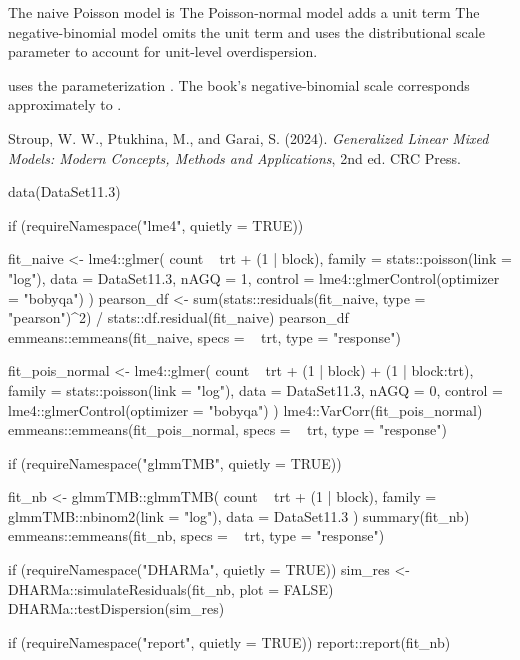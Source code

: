 \documentclass[a4paper]{book}
\begin{document}
%
\begin{Details}
The naive Poisson model is
The Poisson-normal model adds a unit term
The negative-binomial model omits the unit term and uses the distributional
scale parameter to account for unit-level overdispersion.
\end{Details}
%
\begin{Note}
 uses the  parameterization
. The book's negative-binomial scale
\eqn{\phi}{} corresponds approximately to .
\end{Note}
%
\begin{References}
Stroup, W. W., Ptukhina, M., and Garai, S. (2024).
\emph{Generalized Linear Mixed Models: Modern Concepts, Methods and
Applications}, 2nd ed. CRC Press.
\end{References}
%
\begin{SeeAlso}
\end{SeeAlso}
%
\begin{Examples}
\begin{ExampleCode}
data(DataSet11.3)

if (requireNamespace("lme4", quietly = TRUE)) {
  fit_naive <- lme4::glmer(
    count ~ trt + (1 | block),
    family = stats::poisson(link = "log"),
    data = DataSet11.3,
    nAGQ = 1,
    control = lme4::glmerControl(optimizer = "bobyqa")
  )
  pearson_df <- sum(stats::residuals(fit_naive, type = "pearson")^2) /
    stats::df.residual(fit_naive)
  pearson_df
  emmeans::emmeans(fit_naive, specs = ~ trt, type = "response")

  fit_pois_normal <- lme4::glmer(
    count ~ trt + (1 | block) + (1 | block:trt),
    family = stats::poisson(link = "log"),
    data = DataSet11.3,
    nAGQ = 0,
    control = lme4::glmerControl(optimizer = "bobyqa")
  )
  lme4::VarCorr(fit_pois_normal)
  emmeans::emmeans(fit_pois_normal, specs = ~ trt, type = "response")
}

if (requireNamespace("glmmTMB", quietly = TRUE)) {
  fit_nb <- glmmTMB::glmmTMB(
    count ~ trt + (1 | block),
    family = glmmTMB::nbinom2(link = "log"),
    data = DataSet11.3
  )
  summary(fit_nb)
  emmeans::emmeans(fit_nb, specs = ~ trt, type = "response")

  if (requireNamespace("DHARMa", quietly = TRUE)) {
    sim_res <- DHARMa::simulateResiduals(fit_nb, plot = FALSE)
    DHARMa::testDispersion(sim_res)
  }

  if (requireNamespace("report", quietly = TRUE)) {
    report::report(fit_nb)
  }
}
\end{ExampleCode}
\end{Examples}
\end{document}
